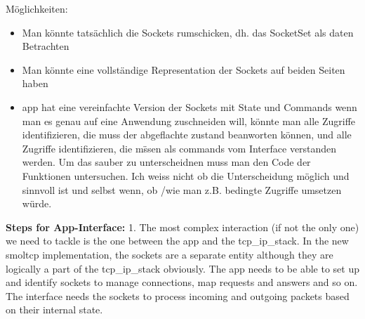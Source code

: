 M\"oglichkeiten:
\begin{itemize}
    \item Man k\"onnte tats\"achlich die Sockets rumschicken, dh. das SocketSet als daten Betrachten 
    \item Man k\"onnte eine vollst\"andige Representation der Sockets auf beiden Seiten haben
    \item app hat eine vereinfachte Version der Sockets mit State und Commands \means wenn man es genau auf eine Anwendung zuschneiden will, k\"onnte man alle  Zugriffe identifizieren, die muss der abgeflachte zustand beanworten k\"onnen, und alle  Zugriffe identifizieren, die m\"ssen als commands vom Interface verstanden werden. \means Um das sauber zu unterscheidnen muss man den Code der Funktionen untersuchen. Ich weiss nicht ob die Unterscheidung m\"oglich und sinnvoll ist und selbst wenn, ob /wie man z.B. bedingte Zugriffe  umsetzen würde. 
\end{itemize}




\textbf{Steps for App-Interface:}
1. The most complex interaction (if not the only one) we need to tackle is the one between the app and the tcp\_ip\_stack. In the new smoltcp implementation, the sockets are a separate entity although they are logically a part of the tcp\_ip\_stack obviously. The app needs to be able to set up and identify sockets to manage connections, map requests and answers and so on. The interface needs the sockets to process incoming and outgoing packets based on their internal state.   




